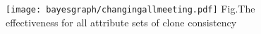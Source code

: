 \begin{figure}[htbp]
\centering
\texttt{[image: bayesgraph/changingallmeeting.pdf]}
{Fig.$\!$}{The effectiveness for all attribute sets of clone consistency}
\vspace{-1em}
\end{figure}

